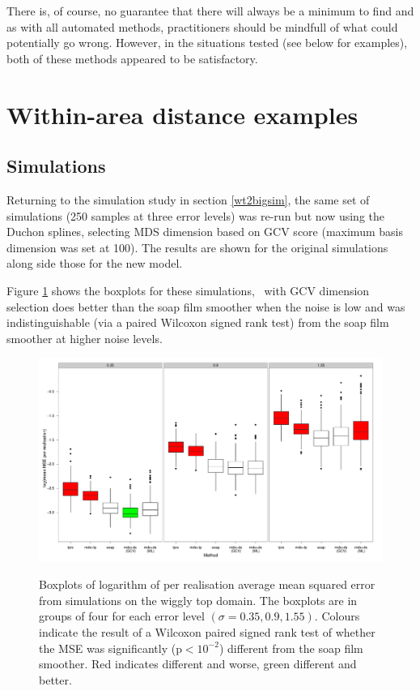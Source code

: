 There is, of course, no guarantee that there will always be a minimum to find and as with all automated methods, practitioners should be mindfull of what could potentially go wrong. However, in the situations tested (see below for examples), both of these methods appeared to be satisfactory.

\section{Within-area distance examples}
\label{gds-wad-examples}
\subsection{Simulations}

Returning to the simulation study in section \ref{wt2bigsim}, the same set of simulations (250 samples at three error levels) was re-run but now using the Duchon splines, selecting MDS dimension based on GCV score (maximum basis dimension was set at 100). The results are shown for the original simulations along side those for the new model.

Figure \ref{wt2-boxplot-duchon} shows the boxplots for these simulations, \mdsds\ with GCV dimension selection does better than the soap film smoother when the noise is low and was indistinguishable (via a paired Wilcoxon signed rank test) from the soap film smoother at higher noise levels.

\begin{figure}
\centering
\includegraphics[width=6in]{mds/figs/wt2-boxplot-duchon.pdf} \\
\caption{Boxplots of logarithm of per realisation average mean squared error from simulations on the wiggly top domain. The boxplots are in groups of four for each error level $(\sigma = 0.35, 0.9, 1.55)$. Colours indicate the result of a Wilcoxon paired signed rank test of whether the MSE was significantly (p$<10^{-2}$) different from the soap film smoother. Red indicates different and worse, green different and better.}
\label{wt2-boxplot-duchon}
\end{figure}

